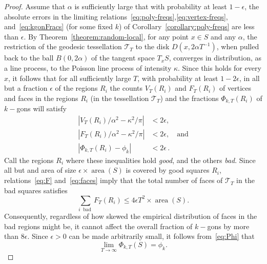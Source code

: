 \documentclass[AHL, Unicode, longabstracts, published]{cedram}
\DeclareMathOperator{\area}{area}
\DeclareMathOperator{\bad}{bad}
\begin{document}
\begin{proof}
Assume that $\alpha$ is sufficiently large that with probability at least $1-\epsilon$, the absolute errors in the limiting relations~\eqref{eq:poly-freqs},\eqref{eq:vertex-freqs}, and~\eqref{eq:kgonFracs} (for some fixed $k$) of Corollary~\ref{corollary:poly-freqs} are less than $\epsilon$. By Theorem~\ref{theorem:random-local}, for any point $x\in S$ and any $\alpha$, the restriction of the geodesic tessellation $\mathcal{T}_{T}$ to the disk $D (x,2\alpha T^{-1})$, when pulled back to the ball $B (0,2\alpha)$ of the tangent space $T_x S$, converges in distribution, as a line process, to the Poisson line process of intensity $\kappa$. Since this holds for every $x$, it follows that for all sufficiently large $T$, with probability at least $1-2\epsilon$, in all but a fraction $\epsilon$ of the regions $R_{i} $ the counts $V_{T} (R_{i})$ and $F_{T} (R_{i})$ of vertices and faces in the regions $R_{i}$ (in the tessellation $\mathcal{T}_{T}$) and the fractions $\Phi_{k,T} (R_{i})$ of $k-$gons will satisfy
\begin{align}
|V_{T}(R_{i})/\alpha^{2} - \kappa^{2}/\pi |&<2\epsilon,\label{eq:V}
\\
|F_{T}(R_{i})/\alpha^{2} - \kappa^{2}/\pi |&<2\epsilon, \quad \text{and}\label{eq:F}
\\
|\Phi_{k,T} (R_{i}) -\phi_{k}|&<2\epsilon \label{eq:Phi}
\,.
\end{align}
Call the regions $R_{i} $ where these inequalities hold \emph{good}, and the others \emph{bad}. Since all but and area of size $\epsilon\times \area (S)$ is covered by good squares $R_{i}$, relations~\eqref{eq:F} and~\eqref{eq:faces} imply that the total number of faces of $\mathcal{T}_{T}$ in the bad squares satisfies
\[
\sum_{i \;\bad} F_{T} (R_{i}) \leq 4\epsilon T^{2}\times \area (S).
\]
Consequently, regardless of how skewed the empirical distribution of faces in the bad regions might be, it cannot affect the overall fraction of $k-$gons by more than $8\epsilon $. Since $\epsilon >0$ can be made arbitrarily small, it follows from~\eqref{eq:Phi} that
\begin{equation}\label{eq:Phi-lim}
\lim_{T \rightarrow \infty} \Phi_{k,T} (S)= \phi_{k}.
\end{equation}


\end{proof}
\end{document}
